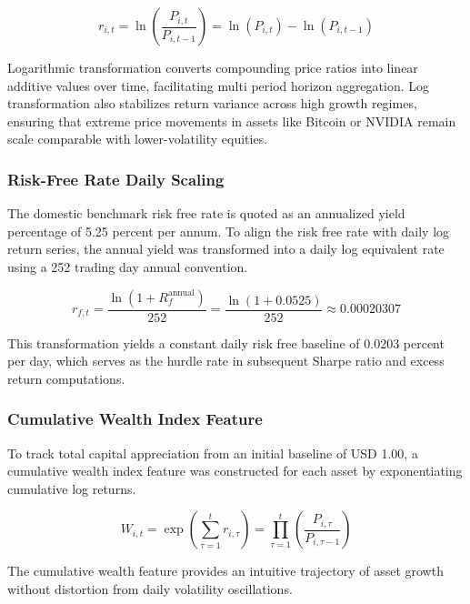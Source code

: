 \begin{equation}
  r_{i,t} = \ln\left(\frac{P_{i,t}}{P_{i,t-1}}\right) = \ln(P_{i,t}) - \ln(P_{i,t-1})
\end{equation}

Logarithmic transformation converts compounding price ratios into linear additive values over time, facilitating multi period horizon aggregation. Log transformation also stabilizes return variance across high growth regimes, ensuring that extreme price movements in assets like Bitcoin or NVIDIA remain scale comparable with lower-volatility equities.

\subsubsection{Risk-Free Rate Daily Scaling}

The domestic benchmark risk free rate is quoted as an annualized yield percentage of 5.25 percent per annum. To align the risk free rate with daily log return series, the annual yield was transformed into a daily log equivalent rate using a 252 trading day annual convention.

\begin{equation}
  r_{f,t} = \frac{\ln(1 + R_f^{\text{annual}})}{252} = \frac{\ln(1 + 0.0525)}{252} \approx 0.00020307
\end{equation}

This transformation yields a constant daily risk free baseline of 0.0203 percent per day, which serves as the hurdle rate in subsequent Sharpe ratio and excess return computations.

\subsubsection{Cumulative Wealth Index Feature}

To track total capital appreciation from an initial baseline of USD 1.00, a cumulative wealth index feature was constructed for each asset by exponentiating cumulative log returns.

\begin{equation}
  W_{i,t} = \exp\left( \sum_{\tau=1}^{t} r_{i,\tau} \right) = \prod_{\tau=1}^{t} \left( \frac{P_{i,\tau}}{P_{i,\tau-1}} \right)
\end{equation}

The cumulative wealth feature provides an intuitive trajectory of asset growth without distortion from daily volatility oscillations.
